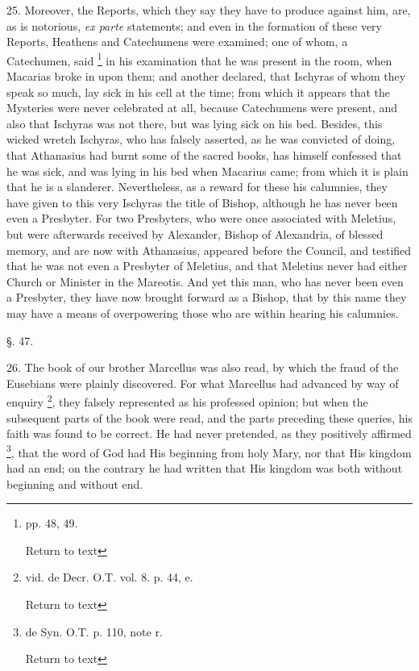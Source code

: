 25. Moreover, the Reports, which they say they
have to produce against him, are, as is notorious, \emph{ex parte}
statements; and even in the formation of these very Reports, Heathens
and Catechumens were examined; one of whom, a Catechumen, said \footnote{pp. 48, 49.

Return to text} in his examination that he was present in the room, when Macarias
broke in upon them; and another declared, that Ischyras of whom they
speak so much, lay sick in his cell at the time; from which it appears
that the Mysteries were never celebrated at all, because Catechumens
were present, and also that Ischyras was not there, but was lying sick
on his bed. Besides, this wicked wretch Ischyras, who has falsely
asserted, as he was convicted of doing, that Athanasius had burnt some
of the sacred books, has himself confessed that he was sick, and was
lying in his bed when Macarius came; from which it is plain that he is
a slanderer. Nevertheless, as a reward for these his calumnies, they
have given to this very Ischyras the title of Bishop, although he has
never been even a Presbyter. For two Presbyters, who were once
associated with Meletius, but were afterwards received by Alexander,
Bishop of Alexandria, of blessed memory, and are now with Athanasius,
appeared before the Council, and testified that he was not even a
Presbyter of Meletius, and that Meletius never had either Church or
Minister in the Mareotis. And yet this man, who has never been even a
Presbyter, they have now brought forward as a Bishop, that by this
name they may have a means of overpowering those who are within
hearing his calumnies.

§. 47.

26. The book of our brother Marcellus was also
read, by which the fraud of the Eusebians were plainly discovered. For
what Marcellus had advanced by way of enquiry \footnote{vid. de Decr. O.T. vol. 8. p. 44, e.

Return to text}, they falsely
represented as his professed opinion; but when the subsequent parts of
the book were read, and the parts preceding these queries, his faith
was found to be correct. He had never pretended, as they positively
affirmed \footnote{de Syn. O.T. p. 110, note r.

Return to text}, that the word of God had His beginning from holy
Mary, nor that His kingdom had an end; on the contrary he had written
that His kingdom was both without beginning and without end.

